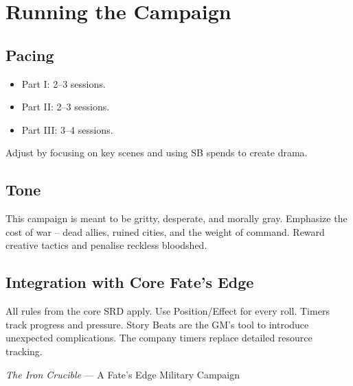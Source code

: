 \documentclass[11pt]{article}
\begin{document}
\section*{Running the Campaign}

\subsection*{Pacing}
\begin{itemize}
\item Part I: 2--3 sessions.
\item Part II: 2--3 sessions.
\item Part III: 3--4 sessions.
\end{itemize}
Adjust by focusing on key scenes and using SB spends to create drama.

\subsection*{Tone}
This campaign is meant to be gritty, desperate, and morally gray. Emphasize the cost of war -- dead allies, ruined cities, and the weight of command. Reward creative tactics and penalise reckless bloodshed.

\subsection*{Integration with Core Fate's Edge}
All rules from the core SRD apply. Use Position/Effect for every roll. Timers track progress and pressure. Story Beats are the GM's tool to introduce unexpected complications. The company timers replace detailed resource tracking.

\vfill
\begin{center}
\small{\emph{The Iron Crucible} --- A Fate's Edge Military Campaign}
\end{center}


\end{document}

